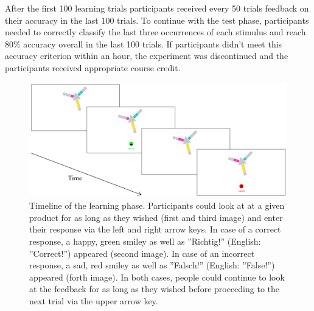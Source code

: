 \documentclass[a4paper,man,natbib]{apa6}
\begin{document}
After the first 100 learning trials participants received every 50 trials feedback on their accuracy in the last 100 trials. To continue with the test phase, participants needed to correctly classify the last three occurrences of each stimulus and reach 80\% accuracy overall in the last 100 trials. If participants didn't meet this accuracy criterion within an hour, the experiment was discontinued and the participants received appropriate course credit.

\begin{figure}[htbp]
\centering
\includegraphics[width = \textwidth]{fig_timeline.png}
\caption{Timeline of the learning phase. Participants could look at at a given product for as long as they wished (first and third image) and enter their response via the left and right arrow keys. In case of a correct response, a happy, green smiley as well as ''Richtig!'' (English: ''Correct!'') appeared (second image). In case of an incorrect response, a sad, red smiley as well as ''Falsch!'' (English: ''False!'') appeared (forth image). In both cases, people could continue to look at the feedback for as long as they wished before proceeding to the next trial via the upper arrow key.}
\label{fig:timeline}
\end{figure}
\end{document}

